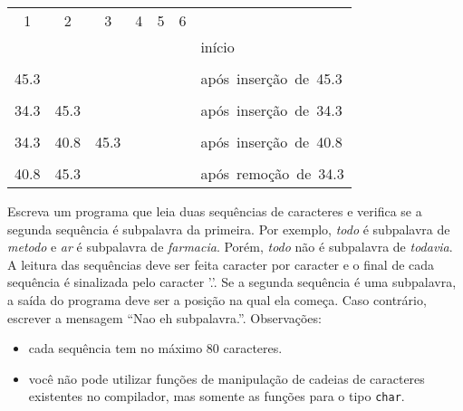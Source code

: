 \begin{center}
\begin{tabular}{|p{1cm}|p{1cm}|p{1cm}|p{1cm}|p{1cm}|p{1cm}|l}
\multicolumn{1}{c}{1} & \multicolumn{1}{c}{2} & \multicolumn{1}{c}{3} & \multicolumn{1}{c}{4} & \multicolumn{1}{c}{5} & \multicolumn{1}{c}{6} & \\ \cline{1-6} 
&&&&&& \mbox{início}\\ \cline{1-6}
\multicolumn{1}{c}{} & \multicolumn{1}{c}{} & \multicolumn{1}{c}{} & \multicolumn{1}{c}{} & \multicolumn{1}{c}{} & \multicolumn{1}{c}{} & \\ \cline{1-6} 
45.3&&&&&& \mbox{após inserção de 45.3}\\ \cline{1-6}
\multicolumn{1}{c}{} & \multicolumn{1}{c}{} & \multicolumn{1}{c}{} & \multicolumn{1}{c}{} & \multicolumn{1}{c}{} & \multicolumn{1}{c}{} & \\ \cline{1-6} 
34.3&45.3&&&&& \mbox{após inserção de 34.3}\\ \cline{1-6}
\multicolumn{1}{c}{} & \multicolumn{1}{c}{} & \multicolumn{1}{c}{} & \multicolumn{1}{c}{} & \multicolumn{1}{c}{} & \multicolumn{1}{c}{} & \\ \cline{1-6} 
34.3&40.8&45.3&&&& \mbox{após inserção de 40.8}\\ \cline{1-6}
\multicolumn{1}{c}{} & \multicolumn{1}{c}{} & \multicolumn{1}{c}{} & \multicolumn{1}{c}{} & \multicolumn{1}{c}{} & \multicolumn{1}{c}{} & \\ \cline{1-6} 
40.8&45.3&&&&& \mbox{após remoção de 34.3}\\ \cline{1-6}
\end{tabular}
\end{center}

\item Escreva um programa 
que leia duas sequências de caracteres e
verifica se a segunda sequência é subpalavra da primeira.
Por exemplo, {\em todo} é subpalavra de {\em metodo} e
{\em ar} é subpalavra de {\em farmacia}.  Porém, {\em todo} não é
subpalavra de {\em todavia}.   A leitura das sequências deve ser feita
caracter por caracter e o final de cada sequência é sinalizada pelo
caracter '.'.    Se a segunda sequência é uma subpalavra, a saída do 
programa deve ser a posição na qual ela começa.  Caso contrário, escrever
a mensagem ``Nao eh subpalavra.''. 
{Observações:} 
\begin{itemize}
\item cada sequência tem no máximo 80 caracteres.
\item você não pode utilizar funções de manipulação de cadeias de
caracteres existentes no compilador, mas somente as funções para o
tipo {\tt char}.
\end{itemize}

